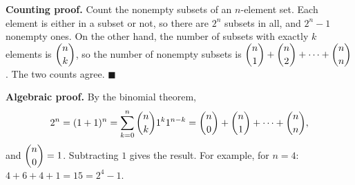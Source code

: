 \textbf{Counting proof.} Count the nonempty subsets of an $n$-element set. Each element is either in a subset or not, so there are $2^n$ subsets in all, and $2^n-1$ nonempty ones. On the other hand, the number of subsets with exactly $k$ elements is $\dbinom nk$, so the number of nonempty subsets is $\dbinom n1+\dbinom n2+\cdots+\dbinom nn$. The two counts agree. $\blacksquare$

\textbf{Algebraic proof.} By the binomial theorem,
\[
2^n=(1+1)^n=\sum_{k=0}^{n}\dbinom nk1^k1^{n-k}=\dbinom n0+\dbinom n1+\cdots+\dbinom nn ,
\]
and $\dbinom n0=1$. Subtracting $1$ gives the result. For example, for $n=4$: $4+6+4+1=15=2^4-1$.

